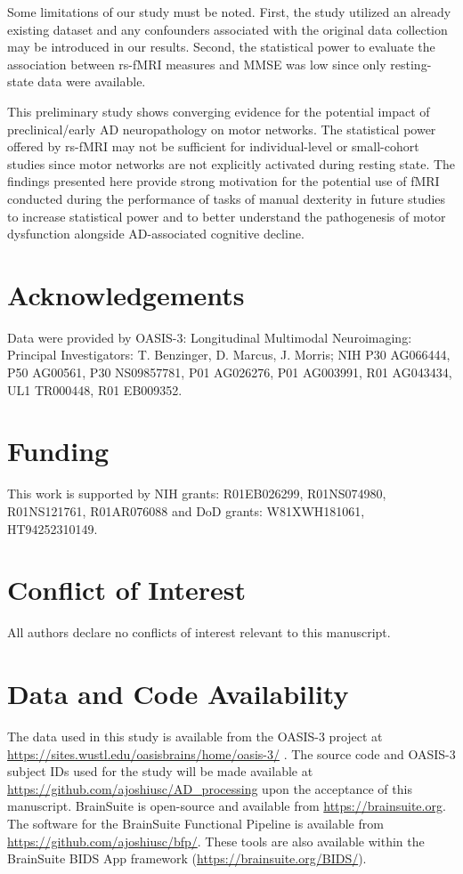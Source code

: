 \documentclass[review,3p,times,12pt,letterpaper]{elsarticle}
\begin{document}

Some limitations of our study must be noted. First, the study utilized an already existing dataset and any confounders associated with the original data collection may be introduced in our results. Second, the statistical power to evaluate the association between rs-fMRI measures and MMSE was low since only resting-state data were available. 

This preliminary study shows converging evidence for the potential impact of preclinical/early AD neuropathology on motor networks. The statistical power offered by rs-fMRI may not be sufficient for individual-level or small-cohort studies since motor networks are not explicitly activated during resting state. The findings presented here provide strong motivation for the potential use of fMRI conducted during the performance of tasks of manual dexterity in future studies to increase statistical power and to better understand the pathogenesis of motor dysfunction alongside AD-associated cognitive decline.

\section*{Acknowledgements}
Data were provided by OASIS-3: Longitudinal Multimodal Neuroimaging: Principal Investigators: T. Benzinger, D. Marcus, J. Morris; NIH P30 AG066444, P50 AG00561, P30 NS09857781, P01 AG026276, P01 AG003991, R01 AG043434, UL1 TR000448, R01 EB009352. 

\section*{Funding}
This work is supported by NIH grants: R01EB026299, R01NS074980,  R01NS121761, R01AR076088 and DoD grants: W81XWH181061, HT94252310149.

\section*{Conflict of Interest}
All authors declare no conflicts of interest relevant to this manuscript.


\section*{Data and Code Availability}
The data used in this study is available from the OASIS-3 project at \url{https://sites.wustl.edu/oasisbrains/home/oasis-3/} \cite{OASIS-3}. The source code and OASIS-3 subject IDs used for the study will be made available at \url{https://github.com/ajoshiusc/AD_processing} upon the acceptance of this manuscript. BrainSuite is open-source and available from \url{https://brainsuite.org}. The software for the BrainSuite Functional Pipeline is available from \url{https://github.com/ajoshiusc/bfp/}. These tools are also available within the BrainSuite BIDS App framework (\url{https://brainsuite.org/BIDS/}).
\end{document}
